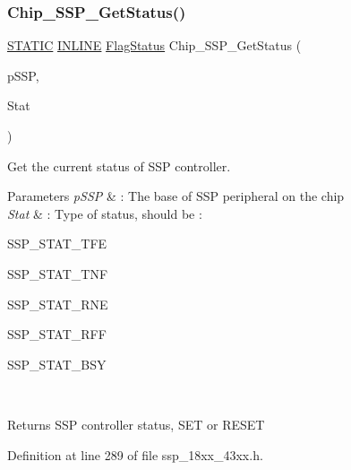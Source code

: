 \subsubsection{\texorpdfstring{Chip\+\_\+\+S\+S\+P\+\_\+\+Get\+Status()}{Chip\_SSP\_GetStatus()}}
{\footnotesize\ttfamily \hyperlink{group___l_p_c___types___public___macros_ga10b2d890d871e1489bb02b7e70d9bdfb}{S\+T\+A\+T\+IC} \hyperlink{spifi__18xx__43xx_8h_a2eb6f9e0395b47b8d5e3eeae4fe0c116}{I\+N\+L\+I\+NE} \hyperlink{group___l_p_c___types___public___types_ga89136caac2e14c55151f527ac02daaff}{Flag\+Status} Chip\+\_\+\+S\+S\+P\+\_\+\+Get\+Status (\begin{DoxyParamCaption}\item[{\hyperlink{struct_l_p_c___s_s_p___t}{L\+P\+C\+\_\+\+S\+S\+P\+\_\+T} $\ast$}]{p\+S\+SP,  }\item[{\hyperlink{group___s_s_p__18_x_x__43_x_x_gad95eaf4325a2ec8e457b309d21d6987d}{S\+S\+P\+\_\+\+S\+T\+A\+T\+U\+S\+\_\+T}}]{Stat }\end{DoxyParamCaption})}



Get the current status of S\+SP controller. 


\begin{DoxyParams}{Parameters}
{\em p\+S\+SP} & \+: The base of S\+SP peripheral on the chip \\
\hline
{\em Stat} & \+: Type of status, should be \+:
\begin{DoxyItemize}
\item S\+S\+P\+\_\+\+S\+T\+A\+T\+\_\+\+T\+FE
\item S\+S\+P\+\_\+\+S\+T\+A\+T\+\_\+\+T\+NF
\item S\+S\+P\+\_\+\+S\+T\+A\+T\+\_\+\+R\+NE
\item S\+S\+P\+\_\+\+S\+T\+A\+T\+\_\+\+R\+FF
\item S\+S\+P\+\_\+\+S\+T\+A\+T\+\_\+\+B\+SY 
\end{DoxyItemize}\\
\hline
\end{DoxyParams}
\begin{DoxyReturn}{Returns}
S\+SP controller status, S\+ET or R\+E\+S\+ET 
\end{DoxyReturn}


Definition at line 289 of file ssp\+\_\+18xx\+\_\+43xx.\+h.

\mbox{\label{group___s_s_p__18_x_x__43_x_x_ga66e20405561e8d3dacba65cbfe41d556}} 
